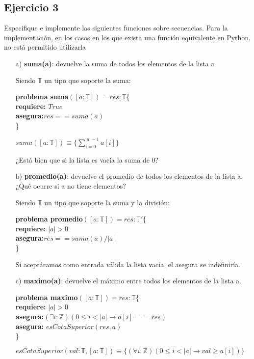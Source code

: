 \documentclass[10pt,a4paper]{article}
\begin{document}
\subsection*{Ejercicio 3}
Especifique e implemente las siguientes funciones sobre secuencias. Para la implementación, en los
casos en los que exista una función equivalente en Python, no está permitido utilizarla
\begin{enumerate}
\item[a)]\textbf{suma(a)}: devuelve la suma de todos los elementos de la lista a

Siendo $\mathbb{T}$ un tipo que soporte la suma:

\textbf{problema suma}$([a : \mathbb{T}])=res:\mathbb{T}$\{ \\
	\textbf{  requiere:} $True$\\
	\textbf{  asegura:}$res==suma(a)$\\
	\}
	
	$suma([a:\mathbb{T}])\equiv \{\sum^{|a|-1}_{i=0}a[i] \} $
	
	¿Está bien que si la lista es vacía la suma de 0?
\item[b)]\textbf{promedio(a)}: devuelve el promedio de todos los elementos de la lista a. ¿Qué ocurre si a no tiene elementos?

Siendo $\mathbb{T}$ un tipo que soporte la suma y la división:

\textbf{problema promedio}$([a : \mathbb{T}])=res:\mathbb{T'}$\{ \\
	\textbf{  requiere:} $|a|>0$\\
	\textbf{  asegura:}$res==suma(a)/|a|$\\
	\}
	
	Si aceptáramos como entrada válida la lista vacía, el asegura se indefiniría.

\item[c)]\textbf{maximo(a)}: devuelve el máximo entre todos los elementos de la lista a.

\textbf{problema maximo}$([a : \mathbb{T}])=res:\mathbb{T}$\{ \\
	\textbf{  requiere:} $|a|>0$\\
	\textbf{  asegura:}$(\exists i:\mathbb{Z})(0\leq i<|a|\rightarrow a[i]== res)$\\
	\textbf{asegura:} $esCotaSuperior(res,a)$\\
	\}
	
	$esCotaSuperior(val:\mathbb{T},[a:\mathbb{T}])\equiv \{(\forall i:\mathbb{Z})(0\leq i<|a| \rightarrow val\geq a[i]) \} $
	

\end{enumerate}
\end{document}
